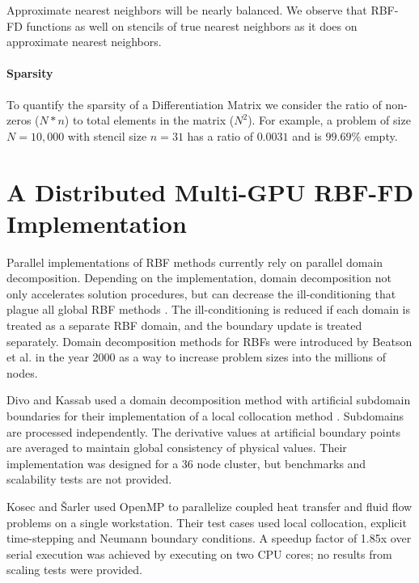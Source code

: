 \documentclass[11pt]{report}
\begin{document}
{Approximate nearest neighbors will be nearly balanced. 
We observe that RBF-FD functions as well on stencils of true nearest neighbors as it does on approximate nearest neighbors. 


\subsubsection{Sparsity}
To quantify the sparsity of a Differentiation Matrix we consider the ratio of non-zeros ($N*n$) to total elements in the matrix ($N^2$). For example, a problem of size $N = 10,000$ with stencil size $n=31$ has a ratio of $0.0031$ and is $99.69\%$ empty. 






\chapter{A Distributed Multi-GPU RBF-FD Implementation}

Parallel implementations of RBF methods currently rely on parallel domain decomposition. Depending on the implementation, domain decomposition not only accelerates solution procedures, but can decrease the ill-conditioning that plague all global RBF methods \cite{Divo2007}. The ill-conditioning is reduced if each domain is treated as a separate RBF domain, and the boundary update is treated separately. Domain decomposition methods for RBFs were introduced by Beatson et al. \cite{Beatson2000} in the year 2000 as a way to increase problem sizes into the millions of nodes.

Divo and Kassab \cite{Divo2007} used a domain decomposition method with artificial 
subdomain boundaries for their implementation of a local collocation method \cite{Divo2007}. 
Subdomains are processed independently. The derivative values 
at artificial boundary points are averaged to maintain global consistency of physical values. Their implementation 
was designed for a 36 node cluster, but benchmarks and scalability tests are not provided.


Kosec and \v{S}arler \cite{Kosec2008} used OpenMP to parallelize coupled heat transfer 
and fluid flow problems on a single workstation. 
Their test cases used local collocation, explicit time-stepping and Neumann boundary conditions. A speedup 
factor of 1.85x over serial execution was achieved by executing on two CPU cores; no 
results from scaling tests were provided. 

}
\end{document}
